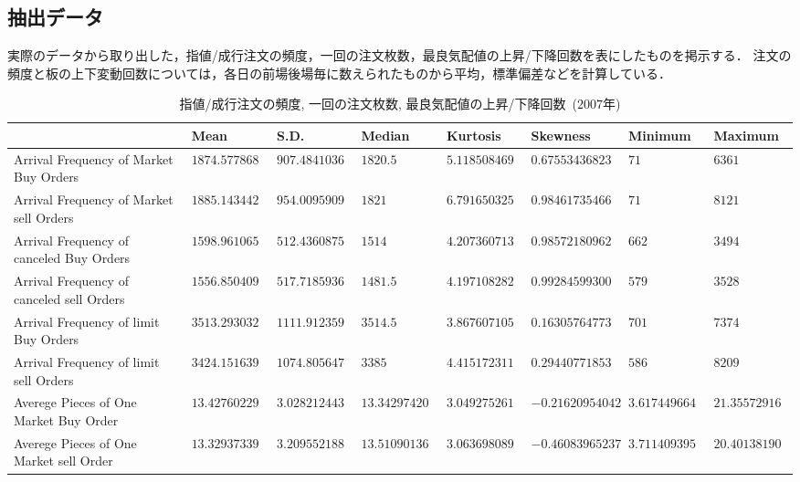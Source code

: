 \documentclass[a4j,papersize,disablejfam,slide,14pt]{jsarticle}
\newcommand{\bhline}[1]{\noalign {\hrule height #1}} %
\begin{document}
\subsection{抽出データ}
    実際のデータから取り出した，指値/成行注文の頻度，一回の注文枚数，最良気配値の上昇/下降回数を表にしたものを掲示する．
    注文の頻度と板の上下変動回数については，各日の前場後場毎に数えられたものから平均，標準偏差などを計算している．
    \begin{table}[H]
    	\centering
        \caption{指値/成行注文の頻度, 一回の注文枚数, 最良気配値の上昇/下降回数\ ($2007$年)}
        \fontsize{6pt}\selectfont
    	\begin{tabularx}{\linewidth}{l||lllllll} \bhline{1.5pt}
        \label{tb:statistics_parameters}
        	 & {\rm Mean} & {\rm S.D.} & {\rm Median} & {\rm Kurtosis} & {\rm Skewness} & {\rm Minimum} & {\rm Maximum} \\ \hline
			{\rm Arrival Frequency of Market Buy Orders} & $1874.57786885246$ & $907.484103685263$ & $1820.5$ & $5.1185084691139$ & $0.675534368239935$ & $71$ & $6361$ \\ \hline
			{\rm Arrival Frequency of Market sell Orders} & $1885.14344262295$ & $954.009590995031$ & $1821$ & $6.79165032585533$ & $0.984617354667294$ & $71$ & $8121$ \\ \hline
			{\rm Arrival Frequency of canceled Buy Orders} & $1598.96106557377$ & $512.436087586418$ & $1514$ & $4.20736071379631$ & $0.985721809628089$ & $662$ & $3494$ \\ \hline
			{\rm Arrival Frequency of canceled sell Orders} & $1556.85040983607$ & $517.718593695995$ & $1481.5$ & $4.19710828262689$ & $0.992845993006138$ & $579$ & $3528$ \\ \hline
			{\rm Arrival Frequency of limit Buy Orders} & $3513.29303278689$ & $1111.91235925032$ & $3514.5$ & $3.86760710536741$ & $0.163057647733439$ & $701$ & $7374$ \\ \hline
			{\rm Arrival Frequency of limit sell Orders} & $3424.15163934426$ & $1074.80564766088$ & $3385$ & $4.41517231120336$ & $0.294407718535047$ & $586$ & $8209$ \\ \hline
			{\rm Averege Pieces of One Market Buy Order} & $13.4276022948203$ & $3.02821244393427$ & $13.3429742057251$ & $3.04927526108989$ & $-0.216209540427003$ & $3.61744966442953$ & $21.3557291666667$ \\ \hline
			{\rm Averege Pieces of One Market sell Order} & $13.3293733928831$ & $3.20955218830292$ & $13.5109013640969$ & $3.06369808944509$ & $-0.460839652375353$ & $3.71140939597315$ & $20.4013819095477$ \\ \hline

\end{tabularx}
\end{table}
\end{document}
